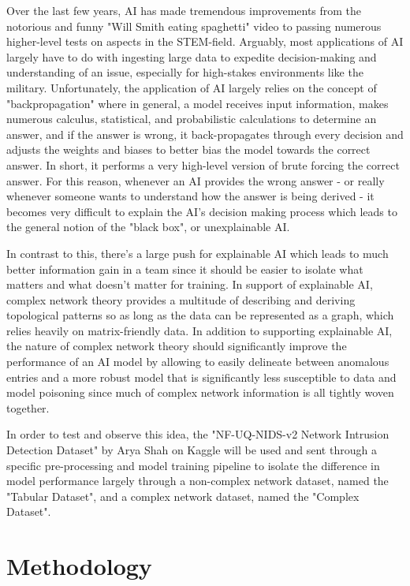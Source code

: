 \documentclass[11pt, twocolumn]{article}
\begin{document}
\indent Over the last few years, AI has made tremendous improvements from the notorious and funny "Will Smith eating spaghetti" video to passing numerous higher-level tests on aspects in the STEM-field.  Arguably, most applications of AI largely have to do with ingesting large data to expedite decision-making and understanding of an issue, especially for high-stakes environments like the military.  Unfortunately, the application of AI largely relies on the concept of "backpropagation" where in general, a model receives input information, makes numerous calculus, statistical, and probabilistic calculations to determine an answer, and if the answer is wrong, it back-propagates through every decision and adjusts the weights and biases to better bias the model towards the correct answer.  In short, it performs a very high-level version of brute forcing the correct answer.  For this reason, whenever an AI provides the wrong answer - or really whenever someone wants to understand how the answer is being derived - it becomes very difficult to explain the AI's decision making process which leads to the general notion of the "black box", or unexplainable AI.  

\indent In contrast to this, there's a large push for explainable AI which leads to much better information gain in a team since it should be easier to isolate what matters and what doesn't matter for training.  In support of explainable AI, complex network theory provides a multitude of describing and deriving topological patterns so as long as the data can be represented as a graph, which relies heavily on matrix-friendly data.  In addition to supporting explainable AI, the nature of complex network theory should significantly improve the performance of an AI model by allowing to easily delineate between anomalous entries and a more robust model that is significantly less susceptible to data and model poisoning since much of complex network information is all tightly woven together.  

\indent In order to test and observe this idea, the "NF-UQ-NIDS-v2 Network Intrusion Detection Dataset" by Arya Shah on Kaggle will be used and sent through a specific pre-processing and model training pipeline to isolate the difference in model performance largely through a non-complex network dataset, named the "Tabular Dataset", and a complex network dataset, named the "Complex Dataset".

\section{Methodology}
\end{document}
